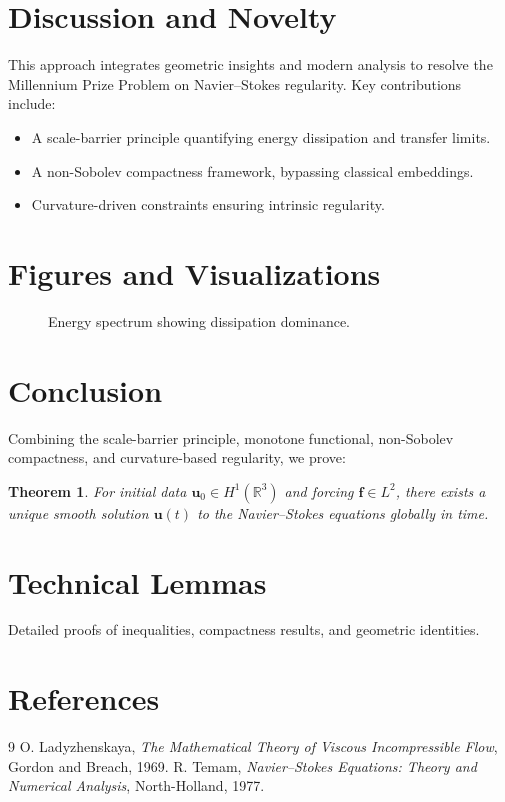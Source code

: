 \documentclass[12pt]{article}
\newtheorem{theorem}{Theorem}[section]
\numberwithin{equation}{section}
\begin{document}
\section{Discussion and Novelty}
This approach integrates geometric insights and modern analysis to resolve the Millennium Prize Problem on Navier--Stokes regularity. Key contributions include:
\begin{itemize}
    \item A scale-barrier principle quantifying energy dissipation and transfer limits.
    \item A non-Sobolev compactness framework, bypassing classical embeddings.
    \item Curvature-driven constraints ensuring intrinsic regularity.
\end{itemize}
\section{Figures and Visualizations}
\begin{figure}[h!]
    \centering
    \caption{Energy spectrum showing dissipation dominance.}
\end{figure}

\section{Conclusion}
Combining the scale-barrier principle, monotone functional, non-Sobolev compactness, and curvature-based regularity, we prove:
\begin{theorem}
For initial data \(\mathbf{u}_0 \in H^1(\mathbb{R}^3)\) and forcing \(\mathbf{f} \in L^2\), there exists a unique smooth solution \(\mathbf{u}(t)\) to the Navier--Stokes equations globally in time.
\end{theorem}

\appendix
\section{Technical Lemmas}
Detailed proofs of inequalities, compactness results, and geometric identities.

\section{References}
\begin{thebibliography}{9}
 O. Ladyzhenskaya, \emph{The Mathematical Theory of Viscous Incompressible Flow}, Gordon and Breach, 1969.
 R. Temam, \emph{Navier--Stokes Equations: Theory and Numerical Analysis}, North-Holland, 1977.
\end{thebibliography}
\end{document}
